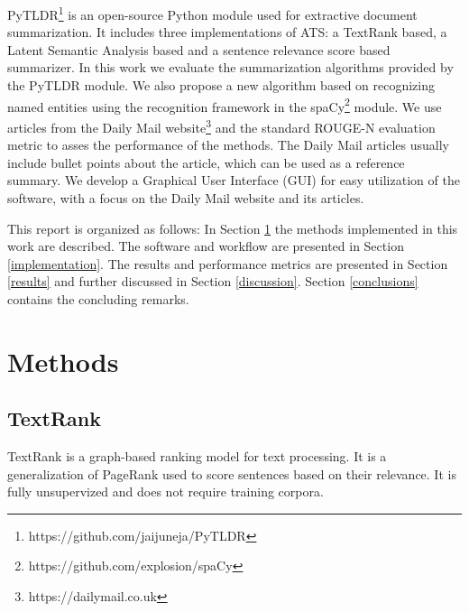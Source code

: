 \documentclass[conference]{IEEEtran}
\begin{document}
PyTLDR\footnote{https://github.com/jaijuneja/PyTLDR} is an open-source Python module used for extractive document summarization. It includes three implementations of ATS: a TextRank based, a Latent Semantic Analysis based and a sentence relevance score based summarizer. In this work we evaluate the summarization algorithms provided by the PyTLDR module. We also propose a new algorithm based on recognizing named entities using the recognition framework in the spaCy\footnote{https://github.com/explosion/spaCy} module.
We use articles from the Daily Mail website\footnote{https://dailymail.co.uk} and the standard ROUGE-N evaluation metric to asses the performance of the methods. The Daily Mail articles usually include bullet points about the article, which can be used as a reference summary. 
We develop a Graphical User Interface (GUI) for easy utilization of the software, with a focus on the Daily Mail website and its articles.

This report is organized as follows: In Section \ref{background} the methods implemented in this work are described. 
The software and workflow are presented in Section \ref{implementation}. The results and performance metrics are presented in Section \ref{results} and further discussed in Section \ref{discussion}. Section \ref{conclusions} contains the concluding remarks.

\section{Methods}\label{background}
\subsection{TextRank}
TextRank \cite{mihalcea2004} is a graph-based ranking model for text processing. It is a generalization of PageRank used to score sentences based on their relevance. It is fully unsupervized and does not require training corpora. 
\end{document}
